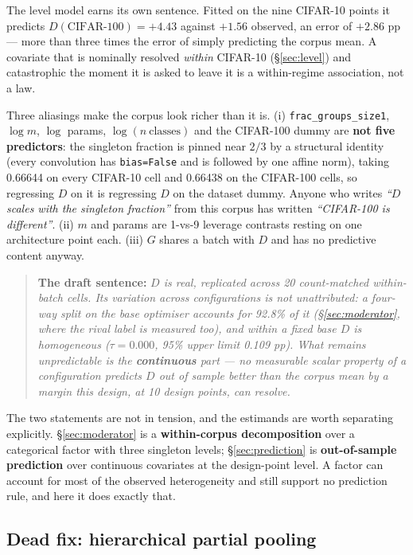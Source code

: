 \documentclass[10pt,letterpaper]{article}
\newcommand{\Dstat}{D}                         %
\newcommand{\Gstat}{G}                         %
\begin{document}
The level model earns its own sentence. Fitted on the nine CIFAR-10 points it predicts
$\Dstat(\text{CIFAR-100}) = \mathbf{+4.43}$ against $\mathbf{+1.56}$ observed, an error of
$+2.86$ pp --- more than three times the error of simply predicting the corpus mean. A covariate that
is nominally resolved \emph{within} CIFAR-10 (\S\ref{sec:level}) and catastrophic the moment it is
asked to leave it is a within-regime association, not a law.

Three aliasings make the corpus look richer than it is. (i) \texttt{frac\_groups\_size1},
$\log m$, $\log$ params, $\log(n\ \text{classes})$ and the CIFAR-100 dummy are \textbf{not five
predictors}: the singleton fraction is pinned near $2/3$ by a structural identity (every
convolution has \texttt{bias=False} and is followed by one affine norm), taking 0.66644 on every
CIFAR-10 cell and 0.66438 on the CIFAR-100 cells, so regressing $\Dstat$ on it is regressing
$\Dstat$ on the dataset dummy. Anyone who writes \emph{``$\Dstat$ scales with the singleton
fraction''} from this corpus has written \emph{``CIFAR-100 is different''}. (ii) $m$ and params
are 1-vs-9 leverage contrasts resting on one architecture point each. (iii) $\Gstat$ shares a
batch with $\Dstat$ and has no predictive content anyway.

\begin{quote}
\textbf{The draft sentence:} \emph{$\Dstat$ is real, replicated across 20 count-matched
within-batch cells. Its variation across configurations is not unattributed: a four-way split on
the base optimiser accounts for 92.8\% of it (\S\ref{sec:moderator}, where the rival label is
measured too), and within a fixed base $\Dstat$ is homogeneous
($\tau = 0.000$, 95\% upper limit 0.109 pp). What remains unpredictable is the \textbf{continuous}
part --- no measurable scalar property of a configuration predicts $\Dstat$ out of sample better
than the corpus mean by a margin this design, at 10 design points, can resolve.}
\end{quote}

The two statements are not in tension, and the estimands are worth separating explicitly.
\S\ref{sec:moderator} is a \textbf{within-corpus decomposition} over a categorical factor with
three singleton levels; \S\ref{sec:prediction} is \textbf{out-of-sample prediction} over
continuous covariates at the design-point level. A factor can account for most of the observed
heterogeneity and still support no prediction rule, and here it does exactly that.

\subsection{Dead fix: hierarchical partial pooling}
\label{sec:pooling}
\end{document}

